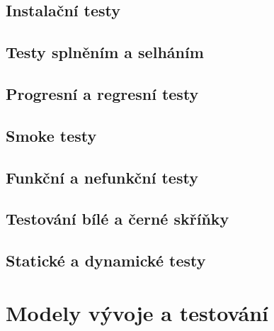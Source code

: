 \subsection{Instalační testy}
\subsection{Testy splněním a selháním}
\subsection{Progresní a regresní testy}
\subsection{Smoke testy}
\subsection{Funkční a nefunkční testy}
\subsection{Testování bílé a černé skříňky}
\subsection{Statické a dynamické testy}

\section{Modely vývoje a testování}

\endinput
